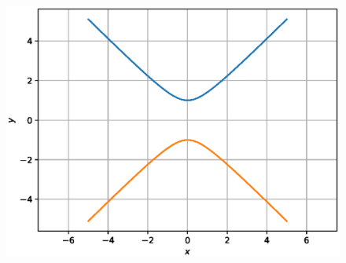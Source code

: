 \documentclass[journal,12pt,twocolumn]{IEEEtran}
\begin{document}
\begin{figure}[!h]
\centering
\includegraphics[width=\columnwidth]{./figs/circle_hyperbola.eps}
\caption{}
\label{fig:circle_hyperbola}
\end{figure}
\end{document}
